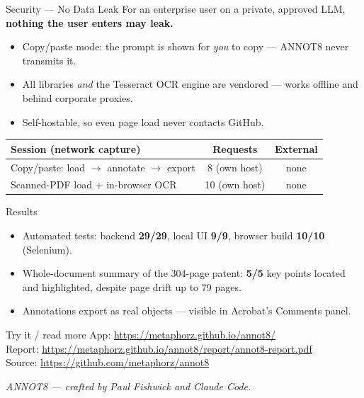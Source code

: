 \documentclass[aspectratio=169,11pt]{beamer}
\begin{document}
\begin{frame}{Security --- No Data Leak}
  For an enterprise user on a private, approved LLM, \textbf{nothing the
  user enters may leak.}
  \begin{itemize}
    \item Copy/paste mode: the prompt is shown for \emph{you} to copy ---
          ANNOT8 never transmits it.
    \item All libraries \emph{and} the Tesseract OCR engine are vendored ---
          works offline and behind corporate proxies.
    \item Self-hostable, so even page load never contacts GitHub.
  \end{itemize}
  \vspace{2pt}
  \begin{center}
  \small
  \begin{tabular}{lcc}
    \toprule
    \textbf{Session (network capture)} & \textbf{Requests} & \textbf{External} \\
    \midrule
    Copy/paste: load $\to$ annotate $\to$ export & 8 (own host) & none \\
    Scanned-PDF load + in-browser OCR & 10 (own host) & none \\
    \bottomrule
  \end{tabular}
  \end{center}
\end{frame}

\begin{frame}{Results}
  \begin{itemize}
    \item Automated tests: backend \textbf{29/29}, local UI \textbf{9/9},
          browser build \textbf{10/10} (Selenium).
    \item Whole-document summary of the 304-page patent: \textbf{5/5} key
          points located and highlighted, despite page drift up to 79 pages.
    \item Annotations export as real objects --- visible in Acrobat's
          Comments panel.
  \end{itemize}
  \vspace{6pt}
  \begin{block}{Try it / read more}
    \footnotesize
    App: \url{https://metaphorz.github.io/annot8/}\\
    Report: \url{https://metaphorz.github.io/annot8/report/annot8-report.pdf}\\
    Source: \url{https://github.com/metaphorz/annot8}
  \end{block}
  \vspace{4pt}
  \centering\small\textit{ANNOT8 --- crafted by Paul Fishwick and Claude Code.}
\end{frame}
\end{document}
